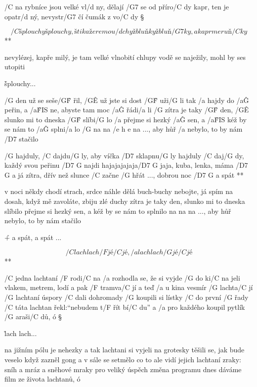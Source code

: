 
/C na rybníce jsou velké vl/d ny, dělají /G7 se od příro/C dy
kapr, ten je opatr/d ný, nevystr/G7 čí čumák z vo/C dy \S

\R  \[ /C šplouchy šplouchy, štika žere mou/d chy
    žbluňky žbluň/G7 ky, a kapr meruň/C ky \] **

nevylézej, kapře milý, je tam velké vlnobití
chlupy vodě se naježily, mohl by ses utopiti

\r šplouchy...




/G den už se seše/G\^F řil, /G\^E už jste si dost /G\^F uži/G li
tak /a hajdy do /a\^G peřin, a /a\^{FIS} ne, abyste tam moc /a\^G řádi/a li
/G zítra je taky /G\^F den, /G\^E slunko mi to dneska /G\^F slíbi/G lo
/a přejme si hezký /a\^G sen, a /a\^{FIS} kéž by se nám to /a\^G splni/a lo
/G na na /{e h e} na ..., aby hůř /a nebylo, to by nám /D7 stačilo

\R  /G hajduly, /C dajdu/G ly, aby víčka /D7 sklapnu/G ly
    hajduly /C daj/G dy, každý svou peřinu /{D7 G} najdi
    hajajajajaja/{D7 G} jaja, kuba, lenka, máma /{D7 G} a já
    zítra, dřív než slunce /C začne /G hřát ...,
    dobrou noc /{D7 G} a spát **

v noci někdy chodí strach, srdce náhle dělá buch-buchy
nebojte, já spím na dosah, když mě zavoláte, zbiju zlé duchy
zítra je taky den, slunko mi to dneska slíbilo
přejme si hezký sen, a kéž by se nám to splnilo
na na na ..., aby hůř nebylo, to by nám stačilo

\r + a spát, a spát ...




\R  \[ /C lach lach /F jé /C jé, /a lach lach /G jé /C jé \] **

/C jedna lachtaní /F rodi/C na
/a rozhodla se, že si vyjde /G do ki/C na
jeli vlakem, metrem, lodí a pak /F tramva/C jí
a teď /a u kina vesmír /G lachta/C jí
/G lachtaní úspory /C dali dohromady
/G koupili si lístky /C do první /G řady
/C táta lachtan řekl:``nebudem t/F řít bí/C du''
a /a pro každého koupil pytlík /G araši/C dů, ó \S

\r  lach lach...

na jižním pólu je nehezky
a tak lachtani si vyjeli na grotesky
těšili se, jak bude veselo
když zazněl gong a v sále se setmělo
co to ale vidí jejich lachtaní zraky:
sníh a mráz a sněhové mraky
pro veliký úspěch změna programu
dnes dáváme film ze života lachtanů, ó

